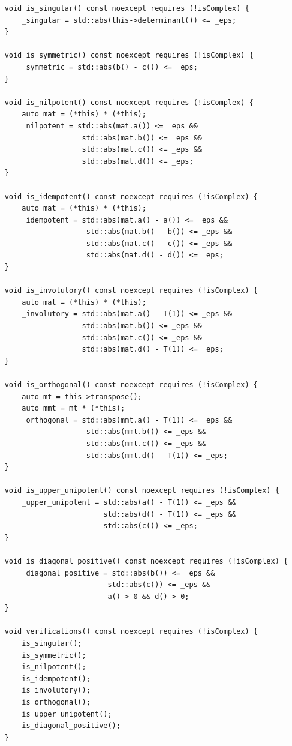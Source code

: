 \documentclass[11pt]{article}
\begin{document}
\begin{lstlisting}
    void is_singular() const noexcept requires (!isComplex) {
        _singular = std::abs(this->determinant()) <= _eps;
    }

    void is_symmetric() const noexcept requires (!isComplex) {
        _symmetric = std::abs(b() - c()) <= _eps;
    }

    void is_nilpotent() const noexcept requires (!isComplex) {
        auto mat = (*this) * (*this);
        _nilpotent = std::abs(mat.a()) <= _eps && 
                      std::abs(mat.b()) <= _eps &&
                      std::abs(mat.c()) <= _eps && 
                      std::abs(mat.d()) <= _eps;
    }

    void is_idempotent() const noexcept requires (!isComplex) {
        auto mat = (*this) * (*this);
        _idempotent = std::abs(mat.a() - a()) <= _eps && 
                       std::abs(mat.b() - b()) <= _eps &&
                       std::abs(mat.c() - c()) <= _eps && 
                       std::abs(mat.d() - d()) <= _eps;
    }

    void is_involutory() const noexcept requires (!isComplex) {
        auto mat = (*this) * (*this);
        _involutory = std::abs(mat.a() - T(1)) <= _eps && 
                      std::abs(mat.b()) <= _eps &&
                      std::abs(mat.c()) <= _eps && 
                      std::abs(mat.d() - T(1)) <= _eps;
    }

    void is_orthogonal() const noexcept requires (!isComplex) {
        auto mt = this->transpose();
        auto mmt = mt * (*this);
        _orthogonal = std::abs(mmt.a() - T(1)) <= _eps && 
                       std::abs(mmt.b()) <= _eps &&
                       std::abs(mmt.c()) <= _eps && 
                       std::abs(mmt.d() - T(1)) <= _eps;
    }

    void is_upper_unipotent() const noexcept requires (!isComplex) {
        _upper_unipotent = std::abs(a() - T(1)) <= _eps && 
                           std::abs(d() - T(1)) <= _eps &&
                           std::abs(c()) <= _eps;
    }

    void is_diagonal_positive() const noexcept requires (!isComplex) {
        _diagonal_positive = std::abs(b()) <= _eps && 
                            std::abs(c()) <= _eps &&
                            a() > 0 && d() > 0;
    }

    void verifications() const noexcept requires (!isComplex) {
        is_singular();
        is_symmetric();
        is_nilpotent();
        is_idempotent();
        is_involutory();
        is_orthogonal();
        is_upper_unipotent();
        is_diagonal_positive();
    }


\end{lstlisting}
\end{document}
